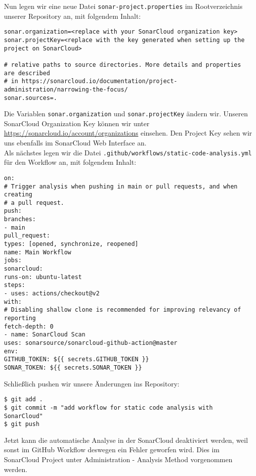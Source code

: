 \noindent
Nun legen wir eine neue Datei \verb|sonar-project.properties|
im Rootverzeichnis unserer Repository an, mit folgendem Inhalt:

\begin{verbatim}
sonar.organization=<replace with your SonarCloud organization key>
sonar.projectKey=<replace with the key generated when setting up the project on SonarCloud>

# relative paths to source directories. More details and properties are described
# in https://sonarcloud.io/documentation/project-administration/narrowing-the-focus/
sonar.sources=.
\end{verbatim}

\noindent
Die Variablen \verb|sonar.organization| und
\verb|sonar.projectKey| ändern wir.
Unseren SonarCloud Organization Key können wir unter
\url{https://sonarcloud.io/account/organizations}
einsehen. 
Den Project Key sehen wir uns ebenfalls im SonarCloud 
Web Interface an. \\

\noindent
Als nächstes legen wir die Datei
\verb|.github/workflows/static-code-analysis.yml| 
für den Workflow an, mit folgendem Inhalt:

\begin{verbatim}
on:
# Trigger analysis when pushing in main or pull requests, and when creating
# a pull request.
push:
branches:
- main
pull_request:
types: [opened, synchronize, reopened]
name: Main Workflow
jobs:
sonarcloud:
runs-on: ubuntu-latest
steps:
- uses: actions/checkout@v2
with:
# Disabling shallow clone is recommended for improving relevancy of reporting
fetch-depth: 0
- name: SonarCloud Scan
uses: sonarsource/sonarcloud-github-action@master
env:
GITHUB_TOKEN: ${{ secrets.GITHUB_TOKEN }}
SONAR_TOKEN: ${{ secrets.SONAR_TOKEN }}
\end{verbatim}

\noindent
Schließlich pushen wir unsere Änderungen ins Repository:

\begin{verbatim}
$ git add .
$ git commit -m "add workflow for static code analysis with SonarCloud"
$ git push
\end{verbatim}

\noindent
Jetzt kann die automatische Analyse in der SonarCloud
deaktiviert werden, weil sonst im GitHub Workflow
deswegen ein Fehler geworfen wird. Dies
im SonarCloud Project unter Administration - Analysis Method
vorgenommen werden.







